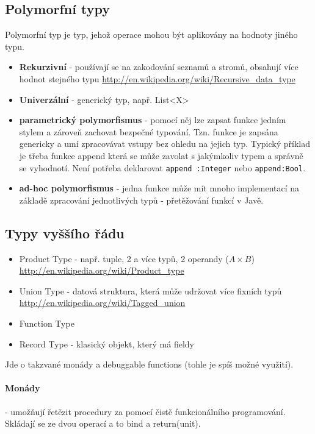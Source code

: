 \subsection{Polymorfní typy}
Polymorfní typ je typ, jehož operace mohou být aplikovány na hodnoty jiného typu.
\begin{itemize}
\item \textbf{Rekurzivní} - používají se na zakodování seznamů a stromů, obsahují více hodnot stejného typu \url{http://en.wikipedia.org/wiki/Recursive_data_type}
\item \textbf{Univerzální} - generický typ, např. List<X>
\item \textbf{parametrický polymorfismus} - pomocí něj lze zapsat funkce jedním stylem a zároveň zachovat bezpečné typování. Tzn. funkce je zapsána genericky a umí zpracovávat vstupy bez ohledu na jejich typ. Typický příklad je třeba funkce append která se může zavolat s jakýmkoliv typem a správně se vyhodnotí. Není potřeba deklarovat \texttt{append :Integer} nebo \texttt{append:Bool}.
\item \textbf{ad-hoc polymorfismus} - jedna funkce může mít mnoho implementací na základě zpracování jednotlivých typů - přetěžování funkcí v Javě.
\end{itemize}



\subsection{Typy vyššího řádu}
\begin{itemize}
\item Product Type - např. tuple, 2 a více typů, 2 operandy ($A \times B$) \url{http://en.wikipedia.org/wiki/Product_type}
\item Union Type - datová struktura, která může udržovat více fixních typů \url{http://en.wikipedia.org/wiki/Tagged_union}
\item Function Type
\item Record Type - klasický objekt, který má fieldy
\end{itemize}

Jde o takzvané monády a debuggable functions (tohle je spíš možné využití). 

\paragraph{Monády} - umožňují řetězit procedury za pomocí čistě funkcionálního programování. Skládají se ze dvou operací a to bind a return(unit). 


